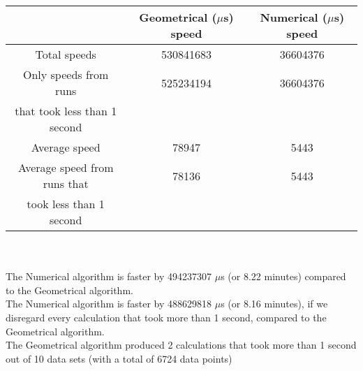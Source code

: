 \begin{tabular}[3]{c|c|c}
 & Geometrical ($\mu$s) speed & Numerical ($\mu$s) speed\\
\hline
Total speeds & 530841683 & 36604376 \\ 
\hline 
Only speeds from runs & 525234194 & 36604376 \\ 
that took less than 1 second & & \\ 
\hline
Average speed & 78947 & 5443 \\
\hline
Average speed from runs that & 78136 & 5443 \\ 
took less than 1 second & & \\ 
\end{tabular}\\ \\
The Numerical algorithm is faster by 494237307 $\mu$s (or 8.22 minutes) compared to the Geometrical algorithm.\\
The Numerical algorithm is faster by 488629818 $\mu$s (or 8.16 minutes), if we disregard every calculation that took more than 1 second, compared to the Geometrical algorithm.\\
The Geometrical algorithm produced 2 calculations that took more than 1 second out of 10 data sets (with a total of 6724 data points)\\
